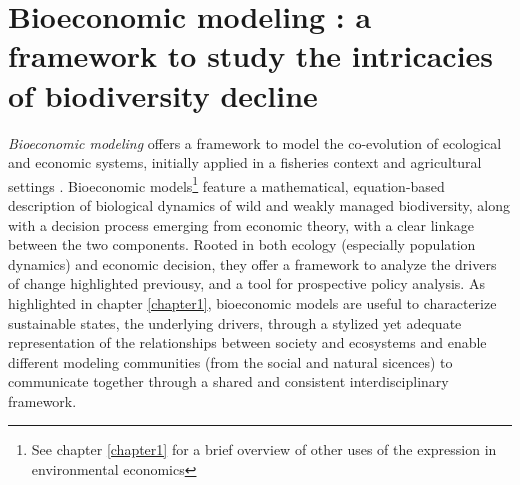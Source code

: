 \section*{Bioeconomic modeling : a framework to study the intricacies of biodiversity decline}

\textit{Bioeconomic modeling} offers a framework to model the co-evolution of ecological and economic systems, initially applied in a fisheries context \citep{Gordon1954, smith_models_1969, clark_profit_1973} and agricultural settings \citep{Hueth1974,Feder1975}.  Bioeconomic models\footnote{See chapter \ref{chapter1} for a brief overview of other uses of the expression in environmental economics} feature a mathematical, equation-based description of biological dynamics of wild and weakly managed biodiversity, along with a decision process emerging from economic theory, with a clear linkage between the two components. Rooted in both ecology (especially population dynamics) and economic decision, they offer a framework to analyze the drivers of change highlighted previousy, and a tool for prospective policy analysis. As highlighted in chapter \ref{chapter1}, bioeconomic models are useful to characterize sustainable states, the underlying drivers, through a stylized yet adequate representation of the relationships between society and ecosystems \citep{IPBES2016} and enable different modeling communities (from the social and natural sicences) to communicate together through a shared and consistent interdisciplinary framework. 

